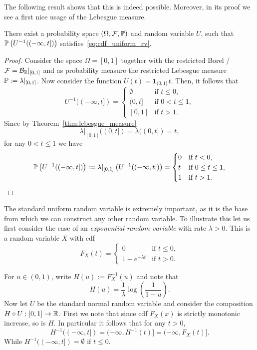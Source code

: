 The following result shows that this is indeed possible. Moreover, in its proof we see a first nice usage of the Lebesgue measure.

\begin{proposition}\label{prop:uniform_random_variable}
There exist a probability space $(\Omega,\mathcal F, \mathbb P)$ and random variable $U$, such that $\mathbb P\left(U^{-1}((-\infty,t])\right)$ satisfies~\eqref{eq:cdf_uniform_rv}.
\end{proposition}

\begin{proof}
Consider the space $\Omega = [0,1]$ together with the restricted Borel \sigalg/ $\mathcal F = \mathcal B_{\mathbb R}|_{[0,1]}$ and as probability measure the restricted Lebesgue measure $\mathbb P := \lambda|_{[0,1]}$. Now consider the function $U(t) = \mathbf{1}_{(0,1]} \, t$. Then, it follows that
\[
	U^{-1}((-\infty,t]) = \begin{cases}
		\emptyset &\text{if } t \le 0,\\
		(0,t] &\text{if } 0 < t \le 1, \\
		[0,1] &\text{if } t > 1.
	\end{cases}
\]
Since by Theorem~\ref{thm:lebesgue_measure}
\[
	\lambda|_{[0,1]}((0,t]) = \lambda((0,t]) = t,
\]
for any $0 < t \le 1$ we have
\[
	\mathbb P\left(U^{-1}((-\infty,t])\right) := \lambda|_{[0,1]}\left(U^{-1}((-\infty,t])\right)
	= \begin{cases}
		0 &\text{if } t < 0,\\
		t &\text{if } 0 \le t\le 1,\\
		1 &\text{if } t > 1.
	\end{cases}
\]
\end{proof}

The standard uniform random variable is extremely important, as it is the base from which we can construct any other random variable. To illustrate this let us first consider the case of an \emph{exponential random variable} with rate $\lambda > 0$. This is a random variable $X$ with cdf
\[
	F_X(t) = \begin{cases}
		0 &\text{if } t \le 0,\\
		1-e^{-\lambda t} &\text{if } t > 0.
	\end{cases}
\]

For $u \in (0,1)$, write $H(u) := F_X^{-1}(u)$ and note that
\[
	H(u) = \frac{1}{\lambda} \log\left(\frac{1}{1-u}\right).
\]
Now let $U$ be the standard normal random variable and consider the composition $H \circ U : [0,1] \to \mathbb R$. First we note that since cdf $F_X(x)$ is strictly monotonic increase, so is $H$. In particular it follows that for any $t > 0$,
\[
	H^{-1}((-\infty,t]) = (-\infty, H^{-1}(t)] = (-\infty, F_X(t)].
\]
While $H^{-1}((-\infty,t]) = \emptyset$ if $t \le 0$.

